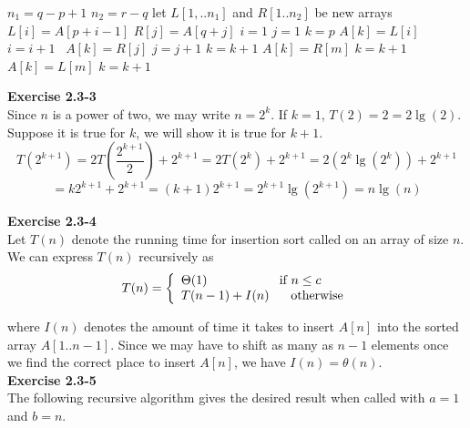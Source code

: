 \documentclass{article}
\begin{document}
\begin{algorithm}
\caption{$Merge(A,p,q,r)$}
\begin{algorithmic}[1]
\State $n_1 = q-p+1$
\State $n_2 = r-q$
\State let $L[1,..n_1]$ and $R[1..n_2]$ be new arrays
	\State $L[i] = A[p+i-1]$
\EndFor
{}
	\State $R[j] = A[q+j]$
\EndFor
\State $i=1$
\State $j=1$
\State $k=p$
		\State $A[k] = L[i]$
		\State $i = i+1$
	\Else  $\,\,\,A[k] = R[j]$
		\State $j = j+1$
	\EndIf
\State $k = k + 1$
\EndWhile
{}
		\State $A[k] = R[m]$
		\State $k = k + 1$	
	\EndFor
\EndIf
{}
		\State $A[k] = L[m]$
		\State $k = k + 1$
	\EndFor
\EndIf
\end{algorithmic}
\end{algorithm}


\noindent\textbf{Exercise 2.3-3}\\

Since $n$ is a power of two, we may write $n= 2^k$. If $k=1$, $T(2) = 2 = 2\lg(2)$. Suppose it is true for $k$, we will show it is true for $k+1$.
\[
T(2^{k+1}) = 2T\left(\frac{2^{k+1}}{2}\right) + 2^{k+1} = 2T\left(2^{k}\right) + 2^{k+1} = 2(2^k\lg(2^k)) + 2^{k+1} \]\[= k2^{k+1}+ 2^{k+1} = (k+1)2^{k+1} = 2^{k+1} \lg(2^{k+1}) = n\lg(n)
\]

\noindent\textbf{Exercise 2.3-4}\\

Let $T(n)$ denote the running time for insertion sort called on an array of size $n$.  We can express $T(n)$ recursively as 
\[ T(n) = \left\{ \begin{array}{l} \Theta(1) \hspace{2cm} \mbox{if } n \leq c \\ T(n-1) + I(n) \hspace{.6cm} \mbox{otherwise}\end{array} \right. \]

where $I(n)$ denotes the amount of time it takes to insert $A[n]$ into the sorted array $A[1..n-1]$.  Since we may have to shift as many as $n-1$ elements once we find the correct place to insert $A[n]$, we have $I(n) = \theta(n)$. \\


\noindent\textbf{Exercise 2.3-5} \\

The following recursive algorithm gives the desired result when called with $a=1$ and $b=n$.
\end{document}
